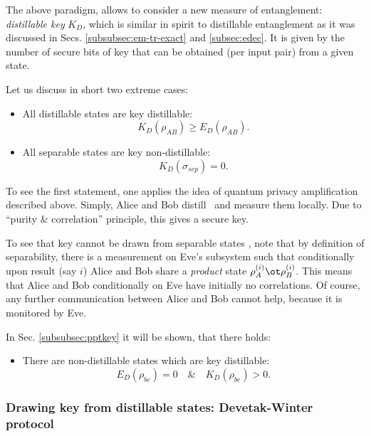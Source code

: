\documentclass[twocolumn,aps,rmp]{revtex4}
\begin{document}
The above paradigm, allows to consider a new measure of entanglement:
{\it distillable key} $K_D$, which is similar in spirit to distillable
entanglement as it was discussed in Secs. \ref{subsubsec:em-tr-exact}
and \ref{subsec:edec}. It is given by the number of secure bits of key
that can be obtained (per input pair) from a given state.

Let us discuss in short two extreme cases:
\begin{itemize}
\item All distillable states are key distillable:
  \begin{equation}
    K_D(\rho_{AB})\geq E_D(\rho_{AB}).
  \end{equation}
\item All separable states are key non-distillable:
  \begin{equation}
    K_D(\sigma_{sep})=0.
  \end{equation}
\end{itemize}

To see the first statement, one applies the idea of quantum privacy
amplification described above. Simply, Alice and Bob distill
\singlets\, and measure them locally. Due to ``purity \& correlation''
principle, this gives a secure key.

To see that key cannot be drawn from separable states
\cite{GisinWolf_linking,CurtyLewLut}, note that by definition of
separability, there is a measurement on Eve's subsystem such that
conditionally upon result (say $i$) Alice and Bob share a {\it
  product} state $\rho_A^{(i)}\ot \rho_B^{(i)}$. This means that Alice
and Bob conditionally on Eve have initially no correlations. Of
course, any further communication between Alice and Bob cannot help,
because it is monitored by Eve.

In Sec. \ref{subsubsec:pptkey} it will be shown, that there holds:
\begin{itemize}
\item There are non-distillable states which are key distillable:
  \begin{equation}
    E_D(\rho_{be})=0\quad\&\quad K_D(\rho_{be})>0.
  \end{equation}
\end{itemize}



\subsubsection{Drawing key from distillable states: Devetak-Winter protocol}
\label{subsubsec:cqq}
\end{document}
